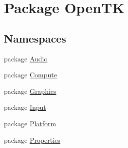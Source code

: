 \hypertarget{namespace_open_t_k}{\section{Package Open\-T\-K}
\label{namespace_open_t_k}
}
\subsection*{Namespaces}
\begin{DoxyCompactItemize}
\item 
package \hyperlink{namespace_open_t_k_1_1_audio}{Audio}
\item 
package \hyperlink{namespace_open_t_k_1_1_compute}{Compute}
\item 
package \hyperlink{namespace_open_t_k_1_1_graphics}{Graphics}
\item 
package \hyperlink{namespace_open_t_k_1_1_input}{Input}
\item 
package \hyperlink{namespace_open_t_k_1_1_platform}{Platform}
\item 
package \hyperlink{namespace_open_t_k_1_1_properties}{Properties}
\end{DoxyCompactItemize}
